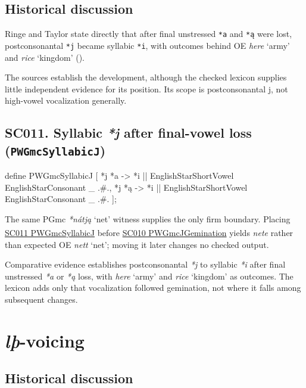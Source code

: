 \documentclass[
  british,
  a4paper,
  openany]{book}
\providecommand{\Pred}[1]{\textsuperscript{\dag}\emph{#1}}
\providecommand{\Recon}[1]{\emph{*#1}}
{\catcode`→=\active \global\def→{\ensuremath{\rightarrow}}}
\providecommand{\texorpdfstring}[2]{#1}
\providecommand{\Pred}[1]{\textsuperscript{\dag}\emph{#1}}
\providecommand{\Recon}[1]{\emph{*#1}}
{\catcode`→=\active \global\def→{\ensuremath{\rightarrow}}}
\begin{document}
\subsection{Historical discussion}\label{historical-discussion-8}

Ringe and Taylor state directly that after final unstressed \texttt{*a}
and \texttt{*ą} were lost, postconsonantal \texttt{*j} became syllabic
\texttt{*i}, with outcomes behind OE \emph{here} `army' and \emph{rice}
`kingdom' ().

The sources establish the development, although the checked lexicon
supplies little independent evidence for its position. Its scope is
postconsonantal j, not high-vowel vocalization generally.

\subsection{\texorpdfstring{SC011. Syllabic \emph{*j} after final-vowel
loss
(\texttt{PWGmcSyllabicJ})}{SC011. Syllabic  after final-vowel loss (PWGmcSyllabicJ)}}\label{rule-PWGmcSyllabicJ}

\begin{ReaderFacingFoma}
define PWGmcSyllabicJ [
    {*j} {*a} -> {*i} || EnglishStarShortVowel EnglishStarConsonant _ .#.,
    {*j} {*ą} -> {*i} || EnglishStarShortVowel EnglishStarConsonant _ .#.
];
\end{ReaderFacingFoma}

The same PGmc \Recon{nátją} `net' witness supplies the only firm
boundary. Placing \hyperref[rule-PWGmcSyllabicJ]{SC011 PWGmcSyllabicJ}
before \hyperref[rule-PWGmcJGemination]{SC010 PWGmcJGemination} yields
\Pred{nete} rather than expected OE \emph{nett} `net'; moving it later
changes no checked output.

Comparative evidence establishes postconsonantal \emph{*j} to syllabic
\emph{*i} after final unstressed \emph{*a} or \emph{*ą} loss, with
\emph{here} `army' and \emph{rice} `kingdom' as outcomes. The lexicon
adds only that vocalization followed gemination, not where it falls
among subsequent changes.

\newpage

\section{\texorpdfstring{\emph{lþ}-voicing}{-voicing}}\label{voicing}

\subsection{Historical discussion}\label{historical-discussion-9}
\end{document}

